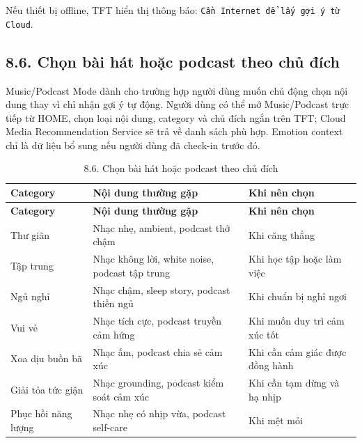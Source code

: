 \documentclass[12pt,a4paper]{article}
\begin{document}
Nếu thiết bị offline, TFT hiển thị thông báo: \texttt{Cần Internet để lấy gợi ý từ Cloud}.


\subsection*{8.6. Chọn bài hát hoặc podcast theo chủ đích}

Music/Podcast Mode dành cho trường hợp người dùng muốn chủ động chọn nội dung thay vì chỉ nhận gợi ý tự động. Người dùng có thể mở Music/Podcast trực tiếp từ HOME, chọn loại nội dung, category và chủ đích ngắn trên TFT; Cloud Media Recommendation Service sẽ trả về danh sách phù hợp. Emotion context chỉ là dữ liệu bổ sung nếu người dùng đã check-in trước đó.


\begin{center}
\begin{longtable}{|P{0.25\textwidth}|P{0.32\textwidth}|P{0.33\textwidth}|}
\caption{8.6. Chọn bài hát hoặc podcast theo chủ đích}\\
\hline
\textbf{Category} & \textbf{Nội dung thường gặp} & \textbf{Khi nên chọn} \\
\hline
\endfirsthead
\hline
\textbf{Category} & \textbf{Nội dung thường gặp} & \textbf{Khi nên chọn} \\
\hline
\endhead
Thư giãn & Nhạc nhẹ, ambient, podcast thở chậm & Khi căng thẳng \\
\hline
Tập trung & Nhạc không lời, white noise, podcast tập trung & Khi học tập hoặc làm việc \\
\hline
Ngủ nghỉ & Nhạc chậm, sleep story, podcast thiền ngủ & Khi chuẩn bị nghỉ ngơi \\
\hline
Vui vẻ & Nhạc tích cực, podcast truyền cảm hứng & Khi muốn duy trì cảm xúc tốt \\
\hline
Xoa dịu buồn bã & Nhạc ấm, podcast chia sẻ cảm xúc & Khi cần cảm giác được đồng hành \\
\hline
Giải tỏa tức giận & Nhạc grounding, podcast kiểm soát cảm xúc & Khi cần tạm dừng và hạ nhịp \\
\hline
Phục hồi năng lượng & Nhạc nhẹ có nhịp vừa, podcast self-care & Khi mệt mỏi \\
\hline
\end{longtable}
\end{center}
\end{document}
